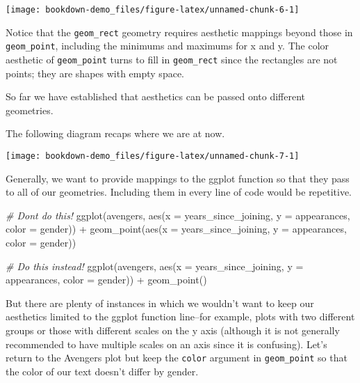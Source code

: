 \documentclass[
]{book}
\newenvironment{Shaded}{\begin{snugshade}}{\end{snugshade}}
\newcommand{\AttributeTok}[1]{\textcolor[rgb]{0.77,0.63,0.00}{#1}}
\newcommand{\CommentTok}[1]{\textcolor[rgb]{0.56,0.35,0.01}{\textit{#1}}}
\newcommand{\FunctionTok}[1]{\textcolor[rgb]{0.00,0.00,0.00}{#1}}
\newcommand{\NormalTok}[1]{#1}
\newcommand{\SpecialCharTok}[1]{\textcolor[rgb]{0.00,0.00,0.00}{#1}}
\begin{document}
\begin{center}\texttt{[image: bookdown-demo\_files/figure-latex/unnamed-chunk-6-1]} \end{center}

Notice that the \texttt{geom\_rect} geometry requires aesthetic mappings beyond those in \texttt{geom\_point}, including the minimums and maximums for x and y. The color aesthetic of \texttt{geom\_point} turns to fill in \texttt{geom\_rect} since the rectangles are not points; they are shapes with empty space.

So far we have established that aesthetics can be passed onto different geometries.

The following diagram recaps where we are at now.

\begin{center}\texttt{[image: bookdown-demo\_files/figure-latex/unnamed-chunk-7-1]} \end{center}

Generally, we want to provide mappings to the ggplot function so that they pass to all of our geometries. Including them in every line of code would be repetitive.

\begin{Shaded}
\begin{Highlighting}[]
\CommentTok{\# Don\textquotesingle{}t do this!}
\FunctionTok{ggplot}\NormalTok{(avengers, }\FunctionTok{aes}\NormalTok{(}\AttributeTok{x =}\NormalTok{ years\_since\_joining,}
                     \AttributeTok{y =}\NormalTok{ appearances,}
                     \AttributeTok{color =}\NormalTok{ gender)) }\SpecialCharTok{+}
  \FunctionTok{geom\_point}\NormalTok{(}\FunctionTok{aes}\NormalTok{(}\AttributeTok{x =}\NormalTok{ years\_since\_joining,}
                 \AttributeTok{y =}\NormalTok{ appearances,}
                 \AttributeTok{color =}\NormalTok{ gender))}

\CommentTok{\# Do this instead!}
\FunctionTok{ggplot}\NormalTok{(avengers, }\FunctionTok{aes}\NormalTok{(}\AttributeTok{x =}\NormalTok{ years\_since\_joining,}
                     \AttributeTok{y =}\NormalTok{ appearances,}
                     \AttributeTok{color =}\NormalTok{ gender)) }\SpecialCharTok{+}
  \FunctionTok{geom\_point}\NormalTok{()}
\end{Highlighting}
\end{Shaded}

But there are plenty of instances in which we wouldn't want to keep our aesthetics limited to the ggplot function line--for example, plots with two different groups or those with different scales on the y axis (although it is not generally recommended to have multiple scales on an axis since it is confusing). Let's return to the Avengers plot but keep the \texttt{color} argument in \texttt{geom\_point} so that the color of our text doesn't differ by gender.
\end{document}
